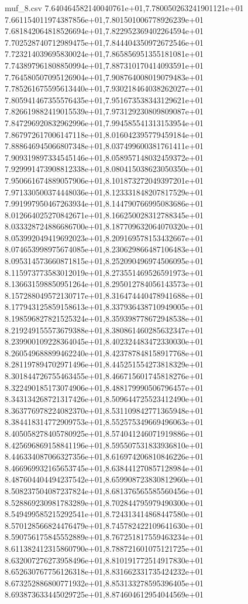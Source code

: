 \begin{filecontents*}{muf_8.csv}
7.640464582140040761e+01,7.780050263241901121e+01
7.661154011974387856e+01,7.801501006778926239e+01
7.681842064818526694e+01,7.822952369402264594e+01
7.702528740712989475e+01,7.844404350972672546e+01
7.723214039695830024e+01,7.865856951355181081e+01
7.743897961808850994e+01,7.887310170414093591e+01
7.764580507095126904e+01,7.908764008019079483e+01
7.785261675595613440e+01,7.930218464038262027e+01
7.805941467355576435e+01,7.951673538343129621e+01
7.826619882419015539e+01,7.973129230809809087e+01
7.847296920832962996e+01,7.994585541313153954e+01
7.867972617006147118e+01,8.016042395779459184e+01
7.888646945066807348e+01,8.037499600381761411e+01
7.909319897334545146e+01,8.058957148032459372e+01
7.929991473908812338e+01,8.080415038623050350e+01
7.950661674889057906e+01,8.101873272049397201e+01
7.971330500374448036e+01,8.123331848207817529e+01
7.991997950467263934e+01,8.144790766995083686e+01
8.012664025270842671e+01,8.166250028312788345e+01
8.033328724886686700e+01,8.187709632064070320e+01
8.053992049419692023e+01,8.209169578153432667e+01
8.074653998975674085e+01,8.230629866487106483e+01
8.095314573660871815e+01,8.252090496974506095e+01
8.115973773583012019e+01,8.273551469526591973e+01
8.136631598850951264e+01,8.295012784056143573e+01
8.157288049572130717e+01,8.316474440478941688e+01
8.177943125859158613e+01,8.337936438710949005e+01
8.198596827821525324e+01,8.359398778672948538e+01
8.219249155573679388e+01,8.380861460285632347e+01
8.239900109228364045e+01,8.402324483472330030e+01
8.260549688899462240e+01,8.423787848158917768e+01
8.281197894702971496e+01,8.445251554273818329e+01
8.301844726755463455e+01,8.466715601745818276e+01
8.322490185173074906e+01,8.488179990506796457e+01
8.343134268721317426e+01,8.509644725523412490e+01
8.363776978224082370e+01,8.531109842771365948e+01
8.384418314772909753e+01,8.552575349669496063e+01
8.405058278405780925e+01,8.574041246071919886e+01
8.425696869158841196e+01,8.595507531833936810e+01
8.446334087066327356e+01,8.616974206810846226e+01
8.466969932165653745e+01,8.638441270857128984e+01
8.487604404494237542e+01,8.659908723830812960e+01
8.508237504087237824e+01,8.681376565585560456e+01
8.528869230981783289e+01,8.702844795979490300e+01
8.549499585215292541e+01,8.724313414868447580e+01
8.570128566824476479e+01,8.745782422109641630e+01
8.590756175845552889e+01,8.767251817559463234e+01
8.611382412315860790e+01,8.788721601075121725e+01
8.632007276273958496e+01,8.810191772514917830e+01
8.652630767756126318e+01,8.831662331735424232e+01
8.673252886800771932e+01,8.853133278595396405e+01
8.693873633445029725e+01,8.874604612954044569e+01

\end{filecontents*}
